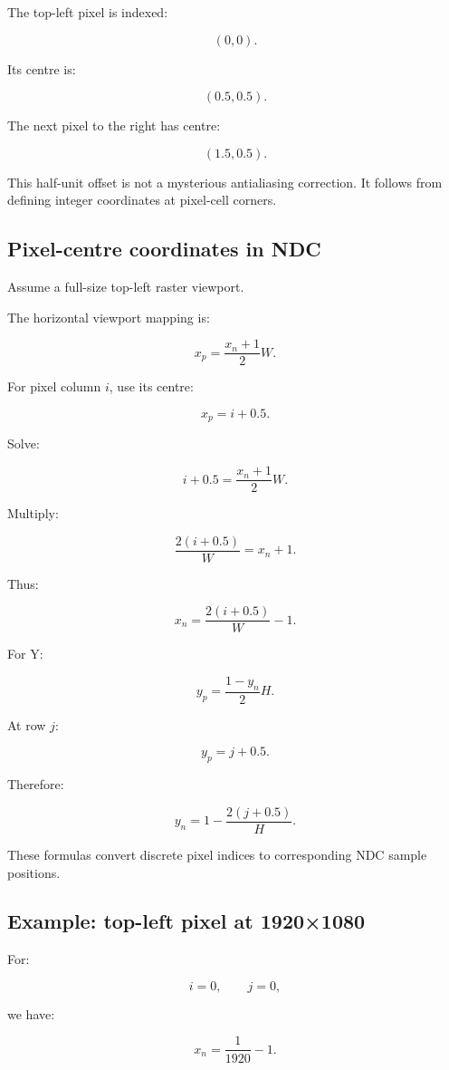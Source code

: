 The top-left pixel is indexed:

\[
 (0,0).
\]

Its centre is:

\[
 \boxed{(0.5,0.5)}.
\]

The next pixel to the right has centre:

\[
 (1.5,0.5).
\]

This half-unit offset is not a mysterious antialiasing correction. It follows from defining integer coordinates at pixel-cell corners.

\subsection{Pixel-centre coordinates in NDC}\label{02-foundations-ii-ch033-pixel-centre-coordinates-in-ndc}

Assume a full-size top-left raster viewport.

The horizontal viewport mapping is:

\[
 x_p=\frac{x_n+1}{2}W.
\]

For pixel column \(i\), use its centre:

\[
 x_p=i+0.5.
\]

Solve:

\[
 i+0.5=\frac{x_n+1}{2}W.
\]

Multiply:

\[
 \frac{2(i+0.5)}W=x_n+1.
\]

Thus:

\[
 \boxed{ x_n=\frac{2(i+0.5)}W-1 }.
\]

For Y:

\[
 y_p=\frac{1-y_n}{2}H.
\]

At row \(j\):

\[
 y_p=j+0.5.
\]

Therefore:

\[
 \boxed{ y_n=1-\frac{2(j+0.5)}H }.
\]

These formulas convert discrete pixel indices to corresponding NDC sample positions.

\subsection{Example: top-left pixel at 1920×1080}\label{02-foundations-ii-ch033-example-top-left-pixel-at-19201080}

For:

\[
 i=0,\qquad j=0,
\]

we have:

\[
 x_n=\frac1{1920}-1.
\]

